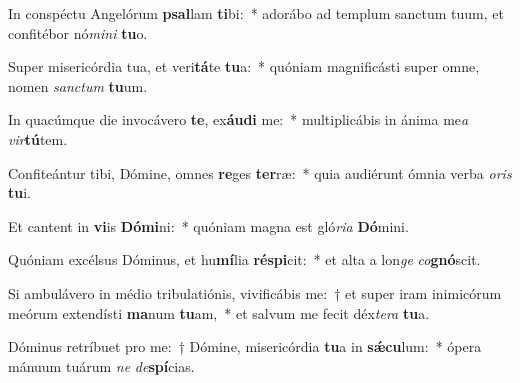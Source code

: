 \item In conspéctu Angelórum \textbf{psal}lam \textbf{ti}bi:~* adorábo ad templum sanctum tuum, et confitébor nó\textit{mi}\textit{ni} \textbf{tu}o.
\item Super misericórdia tua, et veri\textbf{tá}te \textbf{tu}a:~* quóniam magnificásti super omne, nomen \textit{sanc}\textit{tum} \textbf{tu}um.
\item In quacúmque die invocávero \textbf{te}, ex\textbf{áu}\textbf{di} me:~* multiplicábis in ánima me\textit{a} \textit{vir}\textbf{tú}tem.
\item Confiteántur tibi, Dómine, omnes \textbf{re}ges \textbf{ter}ræ:~* quia audiérunt ómnia verba \textit{o}\textit{ris} \textbf{tu}i.
\item Et cantent in \textbf{vi}is \textbf{Dó}\textbf{mi}ni:~* quóniam magna est gló\textit{ri}\textit{a} \textbf{Dó}mini.
\item Quóniam excélsus Dóminus, et hu\textbf{mí}lia \textbf{ré}\textbf{spi}cit:~* et alta a lon\textit{ge} \textit{co}\textbf{gnó}scit.
\item Si ambulávero in médio tribulatiónis, vivificábis me:~† et super iram inimicórum meórum extendísti \textbf{ma}num \textbf{tu}am,~* et salvum me fecit déx\textit{te}\textit{ra} \textbf{tu}a.
\item Dóminus retríbuet pro me:~† Dómine, misericórdia \textbf{tu}a in \textbf{sǽ}\textbf{cu}lum:~* ópera mánuum tuárum \textit{ne} \textit{de}\textbf{spí}cias.
